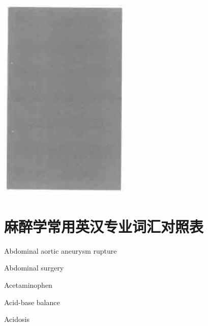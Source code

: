 \documentclass[10pt]{article}
\begin{document}
\begin{center}
\includegraphics[max width=\textwidth]{2024_07_05_645bb794a4d4f32ee0c8g-359}
\end{center}

\section*{麻醉学常用英汉专业词汇对照表}
Abdominal aortic aneurysm rupture

Abdominal surgery

Acetaminophen

Acid-base balance

Acidosis
\end{document}
